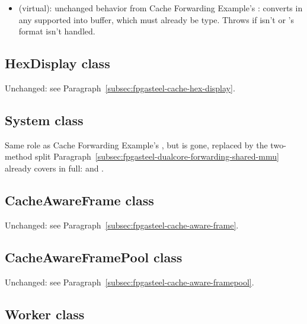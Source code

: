 \begin{itemize}
 \item {} (virtual): unchanged behavior from Cache Forwarding Example's : converts  in any supported  into  buffer, which must already be  type. Throws  if  isn't  or 's format isn't handled.
\end{itemize}

\subsection{HexDisplay class}
\label{subsec:fpgasteel-dualcore-forwarding-hex-display}

Unchanged: see Paragraph~\ref{subsec:fpgasteel-cache-hex-display}.

\subsection{System class}
\label{subsec:fpgasteel-dualcore-forwarding-system}

Same role as Cache Forwarding Example's , but  is gone, replaced by the two-method split Paragraph~\ref{subsec:fpgasteel-dualcore-forwarding-shared-mmu} already covers in full:  and .

\subsection{CacheAwareFrame class}
\label{subsec:fpgasteel-dualcore-forwarding-cache-aware-frame}

Unchanged: see Paragraph~\ref{subsec:fpgasteel-cache-aware-frame}.

\subsection{CacheAwareFramePool class}
\label{subsec:fpgasteel-dualcore-forwarding-cache-aware-framepool}

Unchanged: see Paragraph~\ref{subsec:fpgasteel-cache-aware-framepool}.

\subsection{Worker class}
\label{subsec:fpgasteel-dualcore-forwarding-worker}

